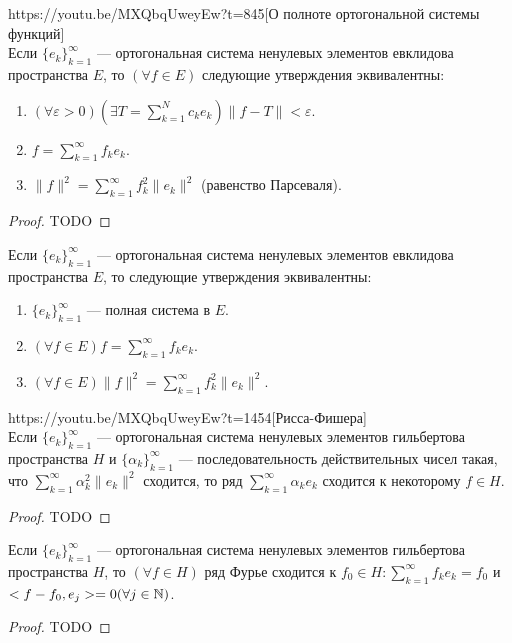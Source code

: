 \begin{linkthm}{https://youtu.be/MXQbqUweyEw?t=845}[О полноте ортогональной системы функций]\ \\
	Если $\{e_k\}_{k=1}^\infty$ --- ортогональная система ненулевых элементов евклидова пространства $E$, то $(\forall f\in E)$ следующие утверждения эквивалентны:
	\begin{enumerate}
		\item $(\forall\varepsilon>0)(\exists T=\sum\limits_{k=1}^Nc_ke_k) \|f-T\|<\varepsilon$.
		\item $f=\sum\limits_{k=1}^\infty f_ke_k$.
		\item $\|f\|^2=\sum\limits_{k=1}^\infty f_k^2\|e_k\|^2$ (равенство Парсеваля).
	\end{enumerate}
\end{linkthm}
\begin{proof}
	TODO%
\end{proof}

\begin{corollary}
	Если $\{e_k\}_{k=1}^\infty$ --- ортогональная система ненулевых элементов евклидова пространства $E$, то следующие утверждения эквивалентны:
	\begin{enumerate}
		\item $\{e_k\}_{k=1}^\infty$ --- полная система в $E$.
		\item $(\forall f\in E) f=\sum\limits_{k=1}^\infty f_ke_k$.
		\item $(\forall f\in E) \|f\|^2=\sum\limits_{k=1}^\infty f_k^2\|e_k\|^2$.
	\end{enumerate}
\end{corollary}

\begin{linkthm}{https://youtu.be/MXQbqUweyEw?t=1454}[Рисса-Фишера]\ \\
	Если $\{e_k\}_{k=1}^\infty$ --- ортогональная система ненулевых элементов гильбертова пространства $H$ и $\{\alpha_k\}_{k=1}^\infty$ --- последовательность действительных чисел такая, что $\sum\limits_{k=1}^\infty \alpha_k^2\|e_k\|^2$ сходится, то ряд $\sum\limits_{k=1}^\infty \alpha_ke_k$ сходится к некоторому $f\in H$.
\end{linkthm}
\begin{proof}
	TODO
\end{proof}

\begin{corollary}
	Если $\{e_k\}_{k=1}^\infty$ --- ортогональная система ненулевых элементов гильбертова пространства $H$, то $(\forall f\in H)$ ряд Фурье сходится к $f_0\in H: \sum\limits_{k=1}^\infty f_ke_k=f_0$ и $<f-f_0,e_j>=0 (\forall j\in \mathbb{N})$.
\end{corollary}
\begin{proof}
TODO
\end{proof}

